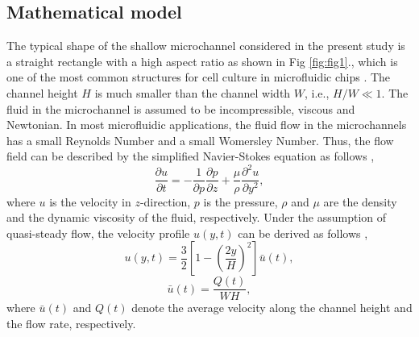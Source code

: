 \documentclass{article}
\begin{document}
\subsection{Mathematical model}
The typical shape of the shallow microchannel considered in the present study is a straight rectangle with a high aspect ratio as shown in Fig \ref{fig:fig1}., which is one of the most common structures for cell culture in microfluidic chips \citep{lane2012parallel,mehling2014microfluidic,van2009microfluidic}. The channel height $H$ is much smaller than the channel width $W$, i.e., $H/W\ll1$. The fluid in the microchannel is assumed to be incompressible, viscous and Newtonian. In most microfluidic applications, the fluid flow in the microchannels has a small Reynolds Number and a small Womersley Number. Thus, the flow field can be described by the simplified Navier-Stokes equation as follows \citep{li2013transport},
\begin{equation}
	\frac{\partial u}{\partial t}=-\frac{1}{\partial p}\frac{\partial p}{\partial z}+\frac{\mu}{\rho}\frac{\partial^2u}{\partial y^2},
\end{equation}	
where $u$ is the velocity in $z$-direction, $p$ is the pressure, $\rho$ and $\mu$ are the density and the dynamic viscosity of the fluid, respectively. Under the assumption of quasi-steady flow, the velocity profile $u\left(y,t\right)$ can be derived as follows \citep{li2018transmission},
\begin{equation}
	u\left(y,t\right)=\frac{3}{2}\left[1-\left(\frac{2y}{H}\right)^2\right]\bar{u}\left(t\right),
\end{equation}
\begin{equation}
	\bar{u}\left(t\right)=\frac{Q\left(t\right)}{WH},
	\label{Eq:3}
\end{equation}
where $\bar{u}\left(t\right)$ and $Q\left(t\right)$ denote the average velocity along the channel height and the flow rate, respectively.\par
\end{document}
